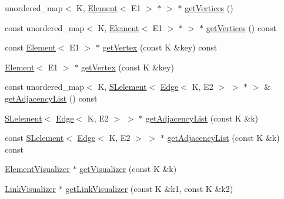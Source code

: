 \begin{DoxyCompactItemize}
\item 
unordered\+\_\+map$<$ K, \hyperlink{classbridges_1_1datastructure_1_1_element}{Element}$<$ E1 $>$ $\ast$ $>$ $\ast$ \hyperlink{classbridges_1_1datastructure_1_1_graph_adj_list_af91334de325f4be241c3c939ea9c5a36}{get\+Vertices} ()
\item 
const unordered\+\_\+map$<$ K, \hyperlink{classbridges_1_1datastructure_1_1_element}{Element}$<$ E1 $>$ $\ast$ $>$ $\ast$ \hyperlink{classbridges_1_1datastructure_1_1_graph_adj_list_a77b21cfdb87c4cf45ce29be6e7dd9791}{get\+Vertices} () const
\item 
const \hyperlink{classbridges_1_1datastructure_1_1_element}{Element}$<$ E1 $>$ $\ast$ \hyperlink{classbridges_1_1datastructure_1_1_graph_adj_list_ada58af550495cee2fe454c0be0f8504e}{get\+Vertex} (const K \&key) const
\item 
\hyperlink{classbridges_1_1datastructure_1_1_element}{Element}$<$ E1 $>$ $\ast$ \hyperlink{classbridges_1_1datastructure_1_1_graph_adj_list_aa55482a035e233299d49874732113e6d}{get\+Vertex} (const K \&key)
\item 
const unordered\+\_\+map$<$ K, \hyperlink{classbridges_1_1datastructure_1_1_s_lelement}{S\+Lelement}$<$ \hyperlink{classbridges_1_1datastructure_1_1_edge}{Edge}$<$ K, E2 $>$ $>$ $\ast$ $>$ \& \hyperlink{classbridges_1_1datastructure_1_1_graph_adj_list_a23dad50371f073dd9a2f48e83720e86c}{get\+Adjacency\+List} () const
\item 
\hyperlink{classbridges_1_1datastructure_1_1_s_lelement}{S\+Lelement}$<$ \hyperlink{classbridges_1_1datastructure_1_1_edge}{Edge}$<$ K, E2 $>$ $>$ $\ast$ \hyperlink{classbridges_1_1datastructure_1_1_graph_adj_list_aa3df7d161ed7847a188b5818f78818d8}{get\+Adjacency\+List} (const K \&k)
\item 
const \hyperlink{classbridges_1_1datastructure_1_1_s_lelement}{S\+Lelement}$<$ \hyperlink{classbridges_1_1datastructure_1_1_edge}{Edge}$<$ K, E2 $>$ $>$ $\ast$ \hyperlink{classbridges_1_1datastructure_1_1_graph_adj_list_a1f8ea98a84017aa4bf6058475c0b3ed0}{get\+Adjacency\+List} (const K \&k) const
\item 
\hyperlink{classbridges_1_1datastructure_1_1_element_visualizer}{Element\+Visualizer} $\ast$ \hyperlink{classbridges_1_1datastructure_1_1_graph_adj_list_a097e4678b1273c29b1ac63319b4535e5}{get\+Visualizer} (const K \&k)
\item 
\hyperlink{classbridges_1_1datastructure_1_1_link_visualizer}{Link\+Visualizer} $\ast$ \hyperlink{classbridges_1_1datastructure_1_1_graph_adj_list_ae36ba10fae403339df0c36707ed13536}{get\+Link\+Visualizer} (const K \&k1, const K \&k2)

\end{DoxyCompactItemize}
